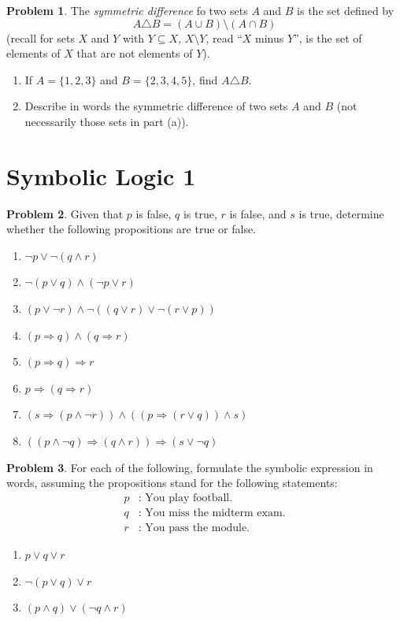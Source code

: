\documentclass[a4paper,12pt]{article}
\numberwithin{equation}{section}
\theoremstyle{plain}
\theoremstyle{definition}
\newtheorem{problem}{Problem}
\newcommand{\then}{\Longrightarrow}
\let\then\Rightarrow
\begin{document}
\begin{problem}
	The \emph{symmetric difference} fo two sets $A$ and $B$ is the set defined by \[
	A \triangle B = (A \cup B) \setminus (A \cap B)
	\]
	(recall for sets $X$ and $Y$ with $Y \subseteq X$, $X \setminus Y$, read ``$X$ minus $Y$'', is the set of elements of $X$ that are not elements of $Y$). 
	\begin{enumerate}[label=(\alph*)]
		\item If $A = \{1,2,3\}$ and $B = \{2,3,4,5\}$, find $A \triangle B$. 
		\item Describe in words the symmetric difference of two sets $A$ and $B$ (not necessarily those sets in part (a)). 
	\end{enumerate} 
\end{problem}

\section*{Symbolic Logic 1}

\begin{problem}
	Given that $p$ is false, $q$ is true, $r$ is false, and $s$ is true, determine whether the following propositions are true or false. 
	\begin{enumerate}[label=(\alph*)]
		\item $\neg p \vee \neg(q \wedge r)$
		\item $\neg(p \vee q) \wedge (\neg p \vee r)$
		\item $(p \vee \neg r) \wedge \neg ((q \vee r) \vee \neg (r \vee p))$
		\item $(p \then q) \wedge (q \then r)$
		\item $(p \then q) \then r$
		\item $p \then (q \then r)$
		\item $(s \then( p \wedge \neg r)) \wedge ((p \then (r \vee q)) \wedge s)$
		\item $((p \wedge \neg q) \then (q \wedge r)) \then (s \vee \neg q)$
	\end{enumerate} 
\end{problem}

\begin{problem}
	For each of the following, formulate the symbolic expression in words, assuming the propositions stand for the following statements: 
	\begin{align*}
	p &: \textrm{ You play football.} \\
	q &: \textrm{ You miss the midterm exam.} \\
	r &: \textrm{ You pass the module.}
	\end{align*}
	\begin{enumerate}[label=(\alph*)]
		\item $p \vee q \vee r$
		\item $\neg(p \vee q) \vee r$
		\item $(p \wedge q) \vee (\neg q \wedge r)$
	\end{enumerate} 
\end{problem}
\end{document}
